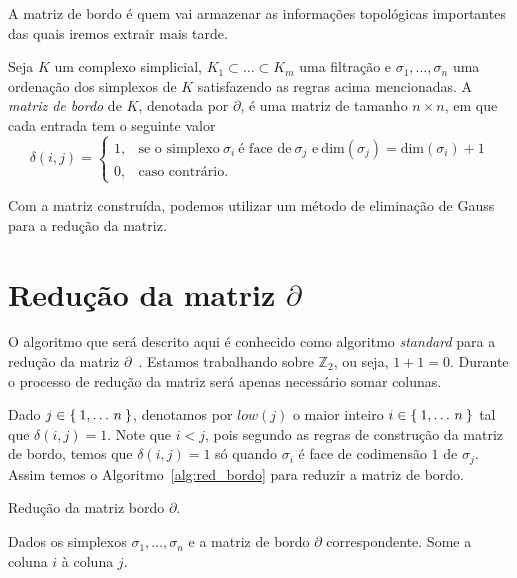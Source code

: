 A matriz de bordo é quem vai armazenar as informações topológicas importantes
das quais iremos extrair mais tarde.
\begin{defi}
  Seja $K$ um complexo simplicial, $K_{1} \subset \dots \subset K_{m}$ uma filtração
  e $\sigma_1, \dots, \sigma_n$ uma ordenação dos simplexos de $K$ satisfazendo as
  regras acima mencionadas. A \textit{matriz de bordo} de $K$, denotada por $\partial$,
  é uma matriz de tamanho $n \times n$, em que cada entrada tem o seguinte valor
  \begin{equation*}
    \delta(i,j) =
      \begin{cases}
        1, & \text{se o simplexo} \ \sigma_i \ \text{é face de} \ \sigma_j
        \text{ e} \ \text{dim}(\sigma_j) = \text{dim}(\sigma_i) + 1 \\
        0, & \text{caso contrário.}
    \end{cases}
  \end{equation*}
\end{defi}
Com a matriz construída, podemos utilizar um método de eliminação de Gauss
para a redução da matriz.

\section{Redução da matriz $\partial$}
O algoritmo que será descrito aqui é conhecido como algoritmo \textit{standard}
para a redução da matriz $\partial$~\cite{Edelsbrunner2000}. Estamos trabalhando
sobre $\mathbb{Z}_2$, ou seja, $1+1 = 0$. Durante o processo de redução da matriz
será apenas necessário somar colunas.

Dado $j \in \Set{1,\dots\,n}$, denotamos por $low(j)$ o maior inteiro
$i \in \Set{1,\dots\,n} $ tal que $\delta(i,j)=1$. Note que $i < j$, pois segundo
as regras de construção da matriz de bordo, temos que $\delta(i,j) = 1$ só
quando $\sigma_i$ é face de codimensão $1$ de $\sigma_j$. Assim temos o
Algoritmo~\ref{alg:red_bordo} para reduzir a matriz de bordo.

\begin{algorithm}[!htpb]
  \caption{Redução da matriz bordo $\partial$.}
  \label{alg:red_bordo}
  \begin{algorithmic}[1]
    \State Dados os simplexos $\sigma_1, \dots, \sigma_n$ e a matriz de bordo
    $\partial$ correspondente.
        \State Some a coluna $i$ à coluna $j$.
      \EndWhile
    \EndFor
  \end{algorithmic}
\end{algorithm}

